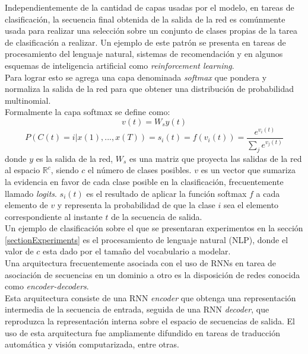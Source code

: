 \documentclass{article}
\begin{document}
	Independientemente de la cantidad de capas usadas por el modelo, en tareas de clasificación, la secuencia final obtenida de la salida de la red es comúnmente usada para realizar una selección sobre un conjunto de clases propias de la tarea de clasificación a realizar. Un ejemplo de este patrón se presenta en tareas de procesamiento del lenguaje natural, sistemas de recomendación y en algunos esquemas de inteligencia artificial como \textit{reinforcement learning}.\\
	Para lograr esto se agrega una capa denominada \textit{softmax} que pondera y normaliza la salida de la red para que obtener una distribución de probabilidad multinomial.\\
	Formalmente la capa softmax se define como:
	\begin{equation*}
	v(t) = W_sy(t)
	\end{equation*}
	\begin{equation*}
	P(C(t) = i | x(1) , ... , x(T))= s_{i}(t) = f(v_i(t)) = \displaystyle\frac{e^{v_{i}(t)}}{\displaystyle\sum_{j} e^{v_{j}(t)}}
	\end{equation*}
	donde $y$ es la salida de la red, $W_s$ es una matriz que proyecta las salidas de la red al espacio $\mathbb{R}^{c}$, siendo $c$ el número de clases posibles. $v$ es un vector que sumariza la evidencia en favor de cada clase posible en la clasificación, frecuentemente llamado \textit{logits}. $s_{i}(t)$ es el resultado de aplicar la función softmax $f$ a cada elemento de $v$ y representa la probabilidad de que la clase $i$ sea el elemento correspondiente al instante $t$ de la secuencia de salida.\\
	Un ejemplo de clasificación sobre el que se presentaran experimentos en la sección \ref{sectionExperiments} es el procesamiento de lenguaje natural (NLP), donde el valor de $c$ esta dado por el tamaño del vocabulario a modelar.\\
	
	Una arquitectura frecuentemente asociada con el uso de RNNs en tarea de asociación de secuencias en un dominio a otro es la disposición de redes conocida como \textit{encoder-decoders}\cite{66EncoderDecoder, 67EncoderDecoderTranslation}.\\
	Esta arquitectura consiste de una RNN \textit{encoder} que obtenga una representación intermedia de la secuencia de entrada, seguida de una RNN \textit{decoder}, que reproduzca la representación interna sobre el espacio de secuencias de salida. El uso de esta arquitectura fue ampliamente difundido en tareas de traducción automática\cite{7MachineTranslation, 51SequenceToSequenceMachineTranslation, 52MachineTranslationAttentionRNN} y visión computarizada\cite{8AttentionModels}, entre otras\cite{15TransductionGraves}.\\
	
\end{document}
